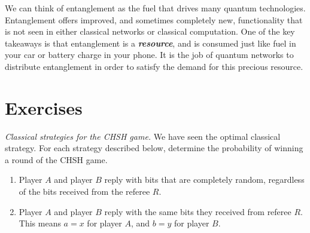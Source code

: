We can think of entanglement as the fuel that drives many quantum technologies. Entanglement offers improved, and sometimes completely new, functionality that is not seen in either classical networks or classical computation.
One of the key takeaways is that entanglement is a \textbf{\emph{resource}}, and is consumed just like fuel in your car or battery charge in your phone.
It is the job of quantum networks to distribute entanglement in order to satisfy the demand for this precious resource.


\newpage
\section{Exercises}

\begin{exercise}
\emph{Classical strategies for the CHSH game.} We have seen the optimal classical strategy. For each strategy described below, determine the probability of winning a round of the CHSH game.
\begin{enumerate}[label=(\alph*)]
    \item Player $A$ and player $B$ reply with bits that are completely random, regardless of the bits received from the referee $R$.
    \item Player $A$ and player $B$ reply with the same bits they received from referee $R$. This means $a=x$ for player $A$, and $b=y$ for player $B$.
\end{enumerate}
\end{exercise}
